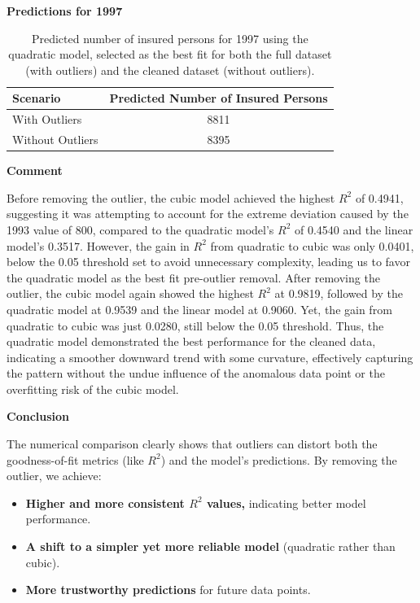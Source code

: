 \documentclass[12pt]{article}
\begin{document}
\textbf{Predictions for 1997}\\

\begin{table}[H]
    \centering
    \begin{tabular}{lc}
        \toprule
        \textbf{Scenario} & \textbf{Predicted Number of Insured Persons} \\
        \midrule
        With Outliers & 8811 \\
        Without Outliers & 8395 \\
        \bottomrule
    \end{tabular}
    \caption{Predicted number of insured persons for 1997 using the quadratic model, selected as the best fit for both the full dataset (with outliers) and the cleaned dataset (without outliers).}
    \label{tab:predictions_1997}
\end{table}
\begin{adjustwidth}{0cm}{0cm}
\textbf{Comment}
\end{adjustwidth}
Before removing the outlier, the cubic model achieved the highest \( R^2 \) of 0.4941, suggesting it was attempting to account for the extreme deviation caused by the 1993 value of 800, compared to the quadratic model’s \( R^2 \) of 0.4540 and the linear model’s 0.3517. However, the gain in \( R^2 \) from quadratic to cubic was only 0.0401, below the 0.05 threshold set to avoid unnecessary complexity, leading us to favor the quadratic model as the best fit pre-outlier removal. After removing the outlier, the cubic model again showed the highest \( R^2 \) at 0.9819, followed by the quadratic model at 0.9539 and the linear model at 0.9060. Yet, the gain from quadratic to cubic was just 0.0280, still below the 0.05 threshold. Thus, the quadratic model demonstrated the best performance for the cleaned data, indicating a smoother downward trend with some curvature, effectively capturing the pattern without the undue influence of the anomalous data point or the overfitting risk of the cubic model.\\
\begin{adjustwidth}{0cm}{0cm}
\textbf{Conclusion}
\end{adjustwidth}
The numerical comparison clearly shows that outliers can distort both the goodness-of-fit metrics (like \( R^2 \)) and the model’s predictions. By removing the outlier, we achieve:

\begin{itemize}
    \item \textbf{Higher and more consistent \( R^2 \) values,} indicating better model performance.
    \item \textbf{A shift to a simpler yet more reliable model} (quadratic rather than cubic).
    \item \textbf{More trustworthy predictions} for future data points. \\
\end{itemize}
\end{document}
